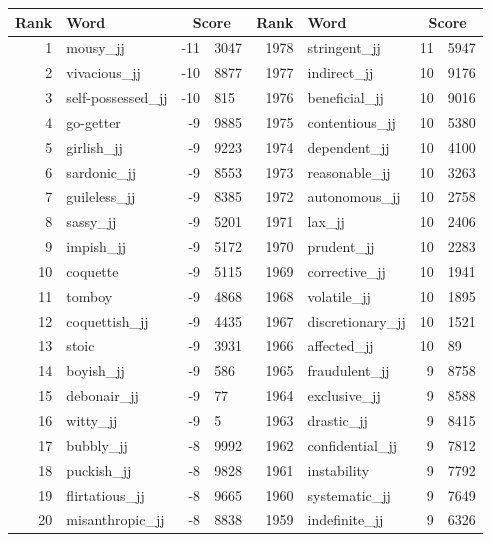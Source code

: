 \begin{table}[tbp]
    \begin{tabular}{| rlr@{.}l | rlr@{.}l |}
    \hline
    \textbf{Rank} & \textbf{Word} & \multicolumn{2}{c|}{\textbf{Score}} & \textbf{Rank} & \textbf{Word} & \multicolumn{2}{c|}{\textbf{Score}} \\
    \hline
    1 & mousy\_jj & -11 & 3047    &    1978 & stringent\_jj & 11 & 5947 \\
    2 & vivacious\_jj & -10 & 8877    &    1977 & indirect\_jj & 10 & 9176 \\
    3 & self-possessed\_jj & -10 & 815    &    1976 & beneficial\_jj & 10 & 9016 \\
    4 & go-getter & -9 & 9885    &    1975 & contentious\_jj & 10 & 5380 \\
    5 & girlish\_jj & -9 & 9223    &    1974 & dependent\_jj & 10 & 4100 \\
    6 & sardonic\_jj & -9 & 8553    &    1973 & reasonable\_jj & 10 & 3263 \\
    7 & guileless\_jj & -9 & 8385    &    1972 & autonomous\_jj & 10 & 2758 \\
    8 & sassy\_jj & -9 & 5201    &    1971 & lax\_jj & 10 & 2406 \\
    9 & impish\_jj & -9 & 5172    &    1970 & prudent\_jj & 10 & 2283 \\
    10 & coquette & -9 & 5115    &    1969 & corrective\_jj & 10 & 1941 \\
    11 & tomboy & -9 & 4868    &    1968 & volatile\_jj & 10 & 1895 \\
    12 & coquettish\_jj & -9 & 4435    &    1967 & discretionary\_jj & 10 & 1521 \\
    13 & stoic & -9 & 3931    &    1966 & affected\_jj & 10 & 89 \\
    14 & boyish\_jj & -9 & 586    &    1965 & fraudulent\_jj & 9 & 8758 \\
    15 & debonair\_jj & -9 & 77    &    1964 & exclusive\_jj & 9 & 8588 \\
    16 & witty\_jj & -9 & 5    &    1963 & drastic\_jj & 9 & 8415 \\
    17 & bubbly\_jj & -8 & 9992    &    1962 & confidential\_jj & 9 & 7812 \\
    18 & puckish\_jj & -8 & 9828    &    1961 & instability & 9 & 7792 \\
    19 & flirtatious\_jj & -8 & 9665    &    1960 & systematic\_jj & 9 & 7649 \\
    20 & misanthropic\_jj & -8 & 8838    &    1959 & indefinite\_jj & 9 & 6326 \\

\end{tabular}
\end{table}
